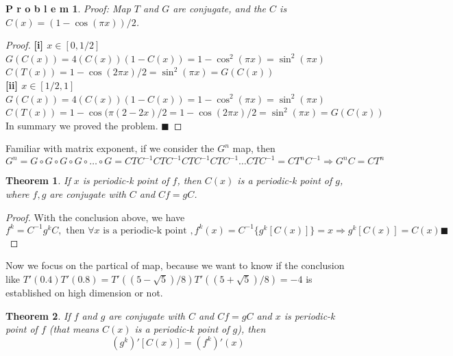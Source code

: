 \documentclass[12pt]{article}
\theoremstyle{plain}
\newtheorem{theorem}{\textbf{Theorem}}[section]
\newtheorem{proof}{\textit{PROOF}}[section]
\newtheorem{problem}{\textbf{P r o b l e m}}[section]
\begin{document}
\begin{problem} Proof: Map $T$ and $G$ are conjugate, and the $C$ is $C(x) = \left(1 - \cos (\pi x)\right)/2$.
\end{problem}
{\color{blue}
\begin{proof}\textbf{[i] $x \in [0, 1/2]$} $G(C(x)) = 4(C(x))(1 - C(x)) = 1 - \cos^2(\pi x) = \sin^2 (\pi x)$
\\\noindent $C(T(x)) = {1 - \cos(2\pi x)} / 2 = \sin^2(\pi x) = G(C(x))$
\\\noindent \textbf{[ii] $x \in [1/2, 1]$} $G(C(x)) = 4(C(x))(1 - C(x)) = 1 - \cos^2(\pi x) = \sin^2 (\pi x)$
\\\noindent $C(T(x)) = {1 - \cos(\pi (2 - 2x)} / 2 = {1 - \cos(2\pi x)} / 2  =\sin^2(\pi x) = G(C(x))$
\\\noindent In summary we proved the problem. $\blacksquare$
\end{proof}
}

Familiar with matrix exponent, if we consider the $G^n$ map, then
$$
G^n = G \circ G \circ G \circ G \circ \ldots \circ G = CTC^{-1}CTC^{-1}CTC^{-1}CTC^{-1} \ldots CTC^{-1} = CT^nC^{-1} \Rightarrow G^nC = CT^n
$$

\begin{theorem} If $x$ is periodic-k point of $f$, then $C(x)$ is a periodic-k point of $g$, where $f, g$ are conjugate with $C$ and $Cf = gC$. 
\end{theorem}
{\color{blue}
\begin{proof} With the conclusion above, we have
$$
f^k = C^{-1}g^kC, \text{ then } \forall x \text{ is a periodic-k point }, f^k(x) = C^{-1}\{g^k[C^{}(x)]\} = x \Rightarrow g^k[C(x)] = C(x) \blacksquare
$$
\end{proof}
}

Now we focus on the partical of map, because we want to know if the conclusion like $T'(0.4)T'(0.8) = T'((5-\sqrt5)/8)T'((5+\sqrt5)/8) = -4$ is established on high dimension or not.
\begin{theorem} If $f$ and $g$ are conjugate with $C$ and $Cf = gC$ and $x$ is periodic-k point of $f$ (that means $C(x)$ is a periodic-k point of $g$), then
$$
(g^k)'[C(x)] = (f^k)'(x)
$$ 
\end{theorem}
\end{document}
